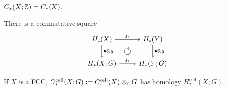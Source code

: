 \documentclass[a4paper,11pt]{article}
\begin{document}
				\begin{remark}
					$C_{\ast}(X;\mathbb{Z})=C_{\ast}(X)$.
				\end{remark}

				\begin{lemma}
					There is a commutative square
					\begin{equation*}
						\begin{tikzcd}
							\hg{X}\ar[d,"\bullet\otimes g"]\ar[r,"f_\ast"]& \hg{Y}\ar[d,"\bullet\otimes g"]\\
							\hg{X;G}\arrow[ur, phantom, "\scalebox{1.5}{$\circlearrowleft$}" description]\ar[r,"f_\ast"]& \hg{Y;G}
						\end{tikzcd}
					\end{equation*}
				\end{lemma}

				\begin{defi}
					If $X$ is a FCC, $C_\ast^\text{cell}(X;G):=C_\ast^\text{cell}(X)\otimes_{\mathbb{Z}} G$ has homology $H_\ast^\text{cell}(X;G)$.
				\end{defi}
\end{document}
